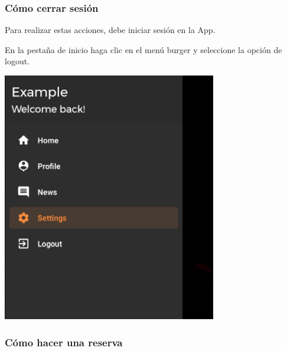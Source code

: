 \documentclass[12pt,a4paper]{article}
\begin{document}
\begin{enumerate}
\end{enumerate}


\subsubsection{Cómo cerrar sesión}

\begin{enumerate}
\item Para realizar estas acciones, debe iniciar sesión en la App.

\begin{minipage}{.60\textwidth}
  \item En la pestaña de inicio haga clic en el menú burger y seleccione la opción de logout.
\end{minipage}
\begin{minipage}{.40\textwidth}
  \includegraphics[width=0.7\textwidth, right]{selecionasettings}
\end{minipage}

\end{enumerate}

\clearpage

\subsubsection{Cómo hacer una reserva}
\end{document}
